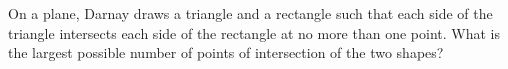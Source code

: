 On a plane, Darnay draws a triangle and a rectangle such that each side of the triangle intersects each side of the rectangle at no more than one point. What is the largest possible number of points of intersection of the two shapes?
